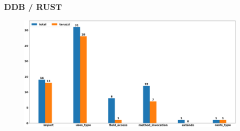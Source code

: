 \documentclass[dvipsnames, 10pt, table]{beamer}
\begin{document}
\begin{frame}
  \frametitle{DDB / RUST}
  \begin{figure}
    \begin{center}
      \includegraphics[width=1.0\textwidth]{figures/testing/bar-plot-rust.png}
    \end{center}
  \end{figure}
\end{frame}
\end{document}
